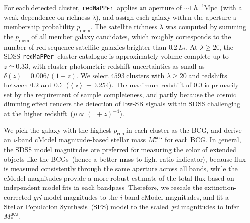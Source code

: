 \documentclass[fleqn,usenatbib]{mnras}
\newcommand{\avg}[1]{\left\langle #1 \right\rangle}
\newcommand{\msbcg}{M_*^{\texttt{BCG}}}
\newcommand{\hmpc}{h^{-1}\mathrm{Mpc}}
\newcommand{\pcen}{p_{\mathrm{cen}}}
\newcommand{\pmem}{p_{\mathrm{mem}}}
\newcommand\redmapper{\texttt{redMaPPer}}
\begin{document}
For each detected cluster, \redmapper~applies an aperture of
${\sim}1\,\hmpc$~(with a weak dependence on richness $\lambda$), and assign
each galaxy within the aperture a membership probability $\pmem$. The
satellite richness $\lambda$ was computed by summing the $\pmem$ of all
member galaxy candidates, which roughly corresponds to the number of
red-sequence satellite galaxies brighter than $0.2\,L_*$. At
$\lambda{\geq}20$, the SDSS \redmapper~cluster catalogue is approximately
volume-complete up to $z{\simeq}0.33$, with cluster photometric redshift
uncertainties as small as $\delta(z){=}0.006/(1+z)$.  We select $4593$
clusters with $\lambda{\geq}20$ and redshifts between $0.2$ and
$0.3$~($\avg{z}{=}0.254$). The maximum redshift of $0.3$ is primarily set
by the requirement of sample completeness, and partly because the cosmic
dimming effect renders the detection of low-SB signals within SDSS
challenging at the higher redshift~($\mu \propto (1+z)^{-4}$).


We pick the galaxy with the highest $\pcen$ in each cluster as the BCG, and
derive an $i$-band cModel magnitude-based stellar mass $\msbcg$ for each
BCG.  In general, the SDSS model magnitudes are preferred for measuring the
color of extended objects like the BCGs~(hence a better mass-to-light ratio
indicator), because flux is measured consistently through the same aperture
across all bands, while the cModel magnitudes provide a more robust
estimate of the total flux based on independent model fits in each
bandpass. Therefore, we rescale the extinction-corrected {\it gri} model
magnitudes to the $i$-band cModel magnitudes, and fit a Stellar Population
Synthesis~(SPS) model to the scaled {\it gri} magnitudes
to infer $\msbcg$.
\end{document}
